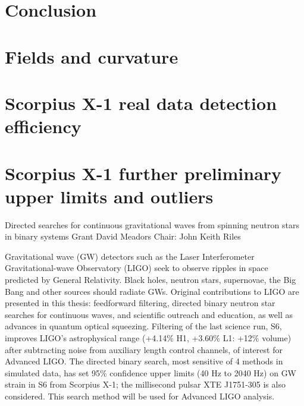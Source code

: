 \documentclass[leqno,twoside]{report}
\theoremstyle{plain}
\theoremstyle{definition}
\theoremstyle{remark}
\numberwithin{theorem}{chapter}        %
\begin{document}
\chapter{Conclusion}
\label{conclusion}



\startappendices
\chapter{Fields and curvature}
\label{appendix}

\chapter{Scorpius X-1 real data detection efficiency}
\label{appendix2}

\chapter{Scorpius X-1 further preliminary upper limits and outliers}
\label{appendix3}





\startabstractpage
{Directed searches for continuous gravitational waves from spinning neutron stars in binary systems } {Grant David Meadors} {Chair: John Keith Riles}

Gravitational wave (GW) detectors such as the Laser Interferometer Gravitational-wave Observatory (LIGO) seek to observe ripples in space predicted by General Relativity. 
Black holes, neutron stars, supernovae, the Big Bang and other sources should radiate GWs.
Original contributions to LIGO are presented in this thesis: feedforward filtering, directed binary neutron star searches for continuous waves, and scientific outreach and education, as well as advances in quantum optical squeezing.
Filtering of the last science run, S6, improves LIGO's astrophysical range (+4.14\% H1, +3.60\% L1: +12\% volume) after subtracting noise from auxiliary length control channels, of interest for Advanced LIGO.
The directed binary search, most sensitive of 4 methods in simulated data, has set 95\% confidence upper limits (40 Hz to 2040 Hz) on GW strain in S6 from Scorpius X-1; the millisecond pulsar XTE J1751-305 is also considered.
This search method will be used for Advanced LIGO analysis.
\end{document}
